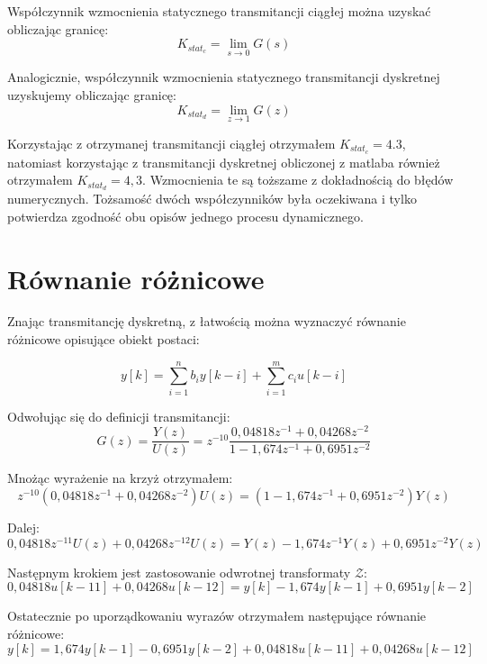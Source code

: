 \documentclass[a4paper,titlepage,11pt,floatssmall]{mwrep}
\begin{document}
\newpage

Współczynnik wzmocnienia statycznego transmitancji ciągłej można uzyskać obliczając granicę:
\begin{equation*}
K_{stat_{c}} = \lim_{s\to 0} G(s) 
\end{equation*} 

Analogicznie, współczynnik wzmocnienia statycznego transmitancji dyskretnej uzyskujemy obliczając granicę:
\begin{equation*}
K_{stat_{d}} = \lim_{z\to 1} G(z)
\end{equation*}

Korzystając z otrzymanej transmitancji ciągłej otrzymałem $K_{stat_{c}} = 4.3$, natomiast korzystając z transmitancji dyskretnej obliczonej z matlaba również otrzymałem $K_{stat_{d}} = 4,3$. Wzmocnienia te są toższame z dokładnością do błędów numerycznych. Tożsamość dwóch współczynników była oczekiwana i tylko potwierdza zgodność obu opisów jednego procesu dynamicznego.

\section{Równanie różnicowe}
Znając transmitancję dyskretną, z łatwością można wyznaczyć równanie różnicowe opisujące obiekt postaci:

\begin{equation*}
y[k] = \sum_{i=1}^{n}b_{i}y[k - i] + \sum_{i=1}^{m}c_{i}u[k - i]
\end{equation*}

Odwołując się do definicji transmitancji:
\begin{equation*}
G(z) = \frac{Y(z)}{U(z)} = z^{-10}\frac{0,04818z^{-1} + 0,04268z^{-2}}{1 - 1,674z^{-1} + 0,6951z^{-2}}
\end{equation*}

Mnożąc wyrażenie na krzyż otrzymałem:
\begin{equation*}
z^{-10}(0,04818z^{-1} + 0,04268z^{-2})U(z) =  (1 - 1,674z^{-1} + 0,6951z^{-2})Y(z)
\end{equation*}

Dalej:
\begin{equation*}
0,04818z^{-11}U(z) + 0,04268z^{-12}U(z) = Y(z) - 1,674z^{-1}Y(z) + 0,6951z^{-2}Y(z)
\end{equation*}

Następnym krokiem jest zastosowanie odwrotnej transformaty $\mathcal{Z}$:
\begin{equation*}
0,04818u[k-11] + 0,04268u[k-12] = y[k] - 1,674y[k-1] + 0,6951y[k-2]
\end{equation*}

Ostatecznie po uporządkowaniu wyrazów otrzymałem następujące równanie różnicowe:
\begin{equation*}
y[k] = 1,674y[k-1] - 0,6951y[k-2] + 0,04818u[k-11] + 0,04268u[k-12]  
\end{equation*}

\newpage






  
\end{document}
